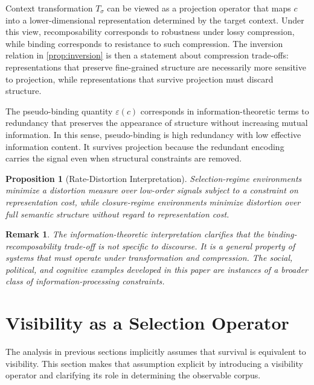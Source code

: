 \documentclass[12pt]{article}
\newtheorem{proposition}{Proposition}[section]
\newtheorem{remark}{Remark}[section]
\begin{document}
Context transformation $T_\sigma$ can be viewed as a projection operator
that maps $c$ into a lower-dimensional representation determined by the
target context. Under this view, recomposability corresponds to
robustness under lossy compression, while binding corresponds to
resistance to such compression. The inversion relation in
\cref{prop:inversion} is then a statement about compression trade-offs:
representations that preserve fine-grained structure are necessarily
more sensitive to projection, while representations that survive
projection must discard structure.

The pseudo-binding quantity $\varepsilon(c)$ corresponds in
information-theoretic terms to redundancy that preserves the appearance
of structure without increasing mutual information. In this sense,
pseudo-binding is high redundancy with low effective information content.
It survives projection because the redundant encoding carries the signal
even when structural constraints are removed.

\begin{proposition}[Rate-Distortion Interpretation]
\label{prop:ratedist}
Selection-regime environments minimize a distortion measure over
low-order signals subject to a constraint on representation cost, while
closure-regime environments minimize distortion over full semantic
structure without regard to representation cost.
\end{proposition}

\begin{remark}
The information-theoretic interpretation clarifies that the
binding-recomposability trade-off is not specific to discourse. It is a
general property of systems that must operate under transformation and
compression. The social, political, and cognitive examples developed in
this paper are instances of a broader class of information-processing
constraints.
\end{remark}

\section{Visibility as a Selection Operator}
\label{sec:visibility}

The analysis in previous sections implicitly assumes that survival is
equivalent to visibility. This section makes that assumption explicit by
introducing a visibility operator and clarifying its role in determining
the observable corpus.
\end{document}
